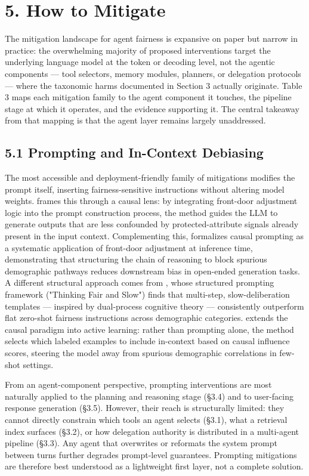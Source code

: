 \documentclass[sigconf,nonacm]{acmart}
\begin{document}
\section{5. How to Mitigate}

The mitigation landscape for agent fairness is expansive on paper but narrow in practice: the overwhelming majority of proposed interventions target the underlying language model at the token or decoding level, not the agentic components — tool selectors, memory modules, planners, or delegation protocols — where the taxonomic harms documented in Section 3 actually originate. Table 3 maps each mitigation family to the agent component it touches, the pipeline stage at which it operates, and the evidence supporting it. The central takeaway from that mapping is that the agent layer remains largely unaddressed.

\subsection{5.1 Prompting and In-Context Debiasing}

The most accessible and deployment-friendly family of mitigations modifies the prompt itself, inserting fairness-sensitive instructions without altering model weights. \cite{li2024prompting} frames this through a causal lens: by integrating front-door adjustment logic into the prompt construction process, the method guides the LLM to generate outputs that are less confounded by protected-attribute signals already present in the input context. Complementing this, \cite{zhang2024causal} formalizes causal prompting as a systematic application of front-door adjustment at inference time, demonstrating that structuring the chain of reasoning to block spurious demographic pathways reduces downstream bias in open-ended generation tasks. A different structural approach comes from \cite{furniturewala2024thinking}, whose structured prompting framework ("Thinking Fair and Slow") finds that multi-step, slow-deliberation templates — inspired by dual-process cognitive theory — consistently outperform flat zero-shot fairness instructions across demographic categories. \cite{du2024causal} extends the causal paradigm into active learning: rather than prompting alone, the method selects which labeled examples to include in-context based on causal influence scores, steering the model away from spurious demographic correlations in few-shot settings.

From an agent-component perspective, prompting interventions are most naturally applied to the planning and reasoning stage (§3.4) and to user-facing response generation (§3.5). However, their reach is structurally limited: they cannot directly constrain which tools an agent selects (§3.1), what a retrieval index surfaces (§3.2), or how delegation authority is distributed in a multi-agent pipeline (§3.3). Any agent that overwrites or reformats the system prompt between turns further degrades prompt-level guarantees. Prompting mitigations are therefore best understood as a lightweight first layer, not a complete solution.
\end{document}
